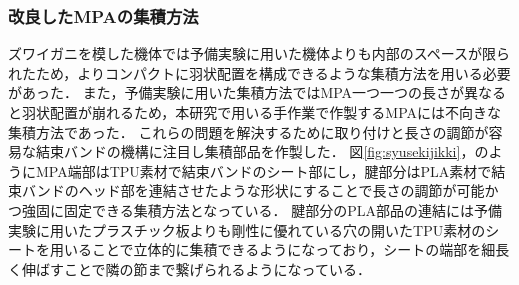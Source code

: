 \subsubsection{改良したMPAの集積方法}
ズワイガニを模した機体では予備実験に用いた機体よりも内部のスペースが限られたため，よりコンパクトに羽状配置を構成できるような集積方法を用いる必要があった．
また，予備実験に用いた集積方法ではMPA一つ一つの長さが異なると羽状配置が崩れるため，本研究で用いる手作業で作製するMPAには不向きな集積方法であった．
これらの問題を解決するために取り付けと長さの調節が容易な結束バンドの機構に注目し集積部品を作製した．
図\ref{fig:syusekijikki}，のようにMPA端部はTPU素材で結束バンドのシート部にし，腱部分はPLA素材で結束バンドのヘッド部を連結させたような形状にすることで長さの調節が可能かつ強固に固定できる集積方法となっている．
腱部分のPLA部品の連結には予備実験に用いたプラスチック板よりも剛性に優れている穴の開いたTPU素材のシートを用いることで立体的に集積できるようになっており，シートの端部を細長く伸ばすことで隣の節まで繋げられるようになっている．

